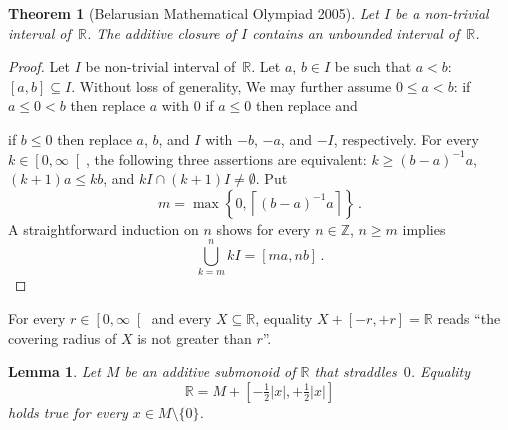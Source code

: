 \documentclass[12pt]{article}
\newcommand{\bZ}{\mathbb{Z}}
\newcommand{\bN}{\mathbb{N}} %
\newcommand{\bR}{\mathbb{R}}
\newcommand{\Rnneg}{\left[0, \infty\right[} %
\newcommand{\ceil}[1]{\left\lceil #1  \right\rceil}
\newcommand{\abs}[1]{\left| #1 \right|}
\newcommand{\thalf}{\tfrac{1}{2}}
\newtheorem{theorem}{Theorem}
\newtheorem{lemma}{Lemma}
\theoremstyle{definition}
\begin{document}
 \begin{theorem}[Belarusian Mathematical Olympiad 2005]
   Let $I$ be a non-trivial interval of~$\bR$.
   The additive closure of $I$ contains an unbounded interval of~$\bR$.
\end{theorem}

\begin{proof}
  Let $I$ be non-trivial interval of~$\bR$.
  Let $a$, $b \in I$ be such that $a < b$: $[a, b] \subseteq I$.
  Without loss of generality,
  We may further assume $0 \le a < b$:
  if $a \le 0 < b$ then replace $a$ with $0$
  if $a \le 0 $ then replace 
  and
  

  if $b \le 0$ then replace $a$, $b$, and $I$ with $- b$, $- a$, and $- I$, respectively. 
  For every $k \in \Rnneg$,
  the following three assertions are equivalent:
  $k \ge {(b - a)}^{-1} a$,
  $(k + 1) a  \le k b$,
  and
  $k I \cap (k + 1) I \ne \emptyset$.
  Put
  $$
  m = \max \left\{ 0, \ceil{{(b - a)}^{-1} a} \right\} \,.
  $$
  A straightforward induction on $n$ shows for every $n \in \bZ$, $n \ge m$ implies 
  $$
  \bigcup_{k = m}^{n} k I = [m a, n b] \,.
  $$
  
  
  
 \end{proof}

For every $r \in \Rnneg$ and every $X \subseteq \bR$, equality $X + [- r, + r ] = \bR$ reads ``the covering radius of $X$ is not greater than $r$''.

\begin{lemma} \label{lem:rateau}
  Let $M$ be an additive submonoid of $\bR$ that straddles~$0$.
  Equality
  \begin{equation} \label{eq:rateau:M+I=R}
  \bR = M +  \left[- \thalf \abs{x}, + \thalf \abs{x} \right] 
  \end{equation} 
  holds true for every $x \in M \setminus \{ 0 \}$.
\end{lemma}
\end{document}
